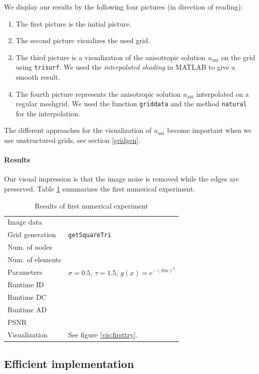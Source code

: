 \documentclass{report}
\def\ani{\text{ani}}
\begin{document}
We display our results by the following four pictures (in direction of reading):
\begin{enumerate}
	\item 
	The first picture is the initial picture.
	\item
	The second picture visualizes the used grid.
	\item
	The third picture is a visualization of the anisotropic solution $u_\ani$ on the grid using \texttt{trisurf}. We used the \emph{interpolated shading} in MATLAB to give a smooth result.
	\item
	The fourth picture represents the anisotropic solution $u_\ani$ interpolated on a regular meshgrid. We used the function \texttt{griddata} and the method \texttt{natural} for the interpolation.
\end{enumerate}
The different approaches for the visualization of $u_\ani$ become important when we use unstructured grids, see section \ref{gridgen}.

\paragraph{Results}

Our visual impression is that the image noise is removed while the edges are preserved. Table \ref{res:firsttry} summarizes the first numerical experiment.

\begin{table}[h]
	\centering
	\begin{tabular}{|ll}
		Image data & \\
		Grid generation & \texttt{getSquareTri} \\
		Num. of nodes \\
		Num. of elements \\
		Parameters & $\sigma=0.5$, $\tau=1.5$, $g(x) = e^{-(10 x)^2}$ \\
		Runtime ID \\
		Runtime DC \\
		Runtime AD \\
		PSNR \\
		Visualization & See figure \ref{vis:firsttry}. \\
	\end{tabular}
	\caption{Results of first numerical experiment}
	\label{res:firsttry}
\end{table}

\subsection{Efficient implementation}
\end{document}
